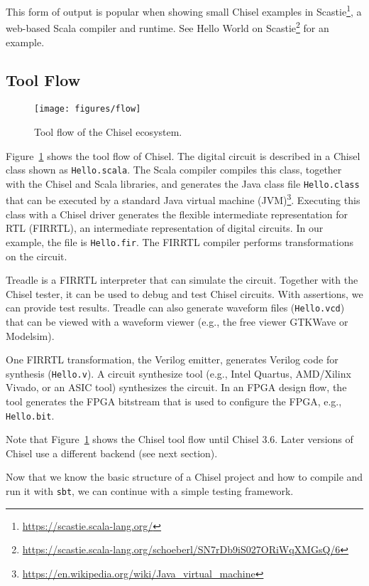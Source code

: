 \documentclass[%
    10pt,
    headinclude, footexclude,
    openright, %
    notitlepage,
    cleardoubleempty,
    headsepline,
    pointlessnumbers,
    bibtotoc, idxtotoc,
    ]{scrbook}
\newcommand{\scale}{0.7}
\newcommand{\code}[1]{{\lstinline[basicstyle=\small\ttfamily]{#1}}}
\newcommand{\myref}[2]{\href{#1}{#2}}
\renewcommand{\myref}[2]{{#2}{\footnote{\url{#1}}}}
\begin{document}
\noindent This form of output is popular when showing small Chisel examples in
\myref{https://scastie.scala-lang.org/}{Scastie}, a web-based Scala compiler and runtime.
See
\myref{https://scastie.scala-lang.org/schoeberl/SN7rDb9iS027ORiWqXMGsQ/6}{Hello World on Scastie}
for an example.


\subsection{Tool Flow}

\begin{figure}
  \centering
  \texttt{[image: figures/flow]}
  \caption{Tool flow of the Chisel ecosystem.}
  \label{fig:flow}
\end{figure}

Figure~\ref{fig:flow} shows the tool flow of Chisel. The digital circuit is described in a Chisel class
shown as \code{Hello.scala}. The Scala compiler compiles this class, together with the Chisel and Scala
libraries, and generates the Java class file \code{Hello.class} that can be executed by a standard
\myref{https://en.wikipedia.org/wiki/Java_virtual_machine}{Java virtual machine (JVM)}.
Executing this class with a Chisel driver generates the flexible intermediate representation for
RTL (FIRRTL), an intermediate representation of digital circuits. In our example, the file is \code{Hello.fir}.
The FIRRTL compiler performs transformations on the circuit.

Treadle is a FIRRTL interpreter that can simulate the circuit. Together with the Chisel tester, it can be
used to debug and test Chisel circuits. With assertions, we can provide test results.
Treadle can also generate waveform files (\code{Hello.vcd}) that can be viewed with
a waveform viewer (e.g., the free viewer GTKWave or Modelsim).

One FIRRTL transformation, the Verilog emitter, generates Verilog code for synthesis (\code{Hello.v}).
A circuit synthesize tool (e.g., Intel Quartus, AMD/Xilinx Vivado, or an ASIC tool) synthesizes the circuit.
In an FPGA design flow, the tool generates the FPGA bitstream that is used to configure the FPGA,
e.g., \code{Hello.bit}.

Note that Figure~\ref{fig:flow} shows the Chisel tool flow until Chisel 3.6.
Later versions of Chisel use a different backend (see next section).

Now that we know the basic structure of a Chisel project and how to compile and run it
with \code{sbt}, we can continue with a simple testing framework.
\end{document}
